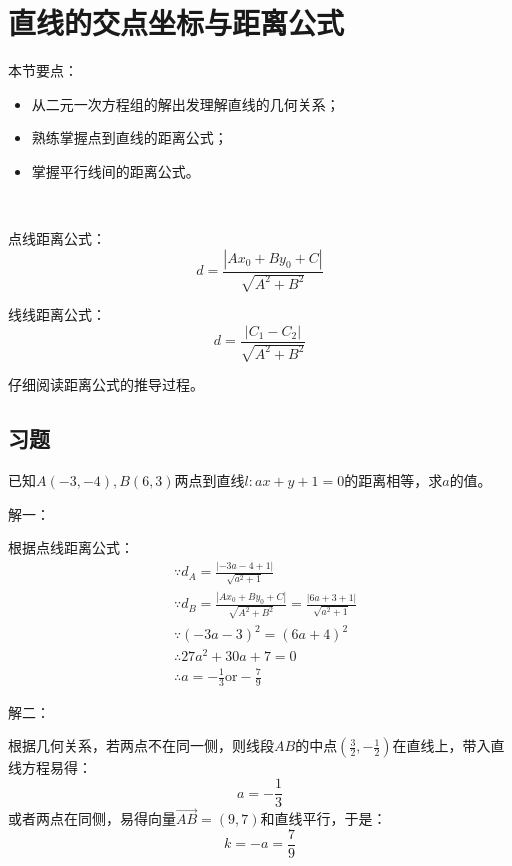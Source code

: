 \section{直线的交点坐标与距离公式}

本节要点：
\begin{itemize}
    \item 从二元一次方程组的解出发理解直线的几何关系；
    \item 熟练掌握点到直线的距离公式；
    \item 掌握平行线间的距离公式。
\end{itemize}

~

点线距离公式：
\[
d=\frac{\left| Ax_0+By_0+C \right|}{\sqrt{A^2+B^2}}
\]

线线距离公式：
\[
d=\frac{\left| C_1-C_2 \right|}{\sqrt{A^2+B^2}}
\]

\begin{tcolorbox}
仔细阅读距离公式的推导过程。
\end{tcolorbox}

\subsection{习题}

\begin{example}
已知$A\left( -3,-4 \right) ,B\left( 6,3 \right) $两点到直线$l:ax+y+1=0$的距离相等，求$a$的值。
\end{example}

解一：

根据点线距离公式：
\begin{align*}
&\because d_A=\frac{\left| -3a-4+1 \right|}{\sqrt{a^2+1}} \\
&\because d_B=\frac{\left| Ax_0+By_0+C \right|}{\sqrt{A^2+B^2}}=\frac{\left| 6a+3+1 \right|}{\sqrt{a^2+1}} \\
&\because \left( -3a-3 \right) ^2=\left( 6a+4 \right) ^2 \\
&\therefore 27a^2+30a+7=0 \\
&\therefore a=-\frac{1}{3}\mathrm{or}-\frac{7}{9}
\end{align*}

解二：

根据几何关系，若两点不在同一侧，则线段$AB$的中点$\left( \frac{3}{2},-\frac{1}{2} \right) $在直线上，带入直线方程易得：
\[
a=-\frac{1}{3}
\]
或者两点在同侧，易得向量$\overrightarrow{AB}=\left( 9,7 \right) $和直线平行，于是：
\[
k=-a=\frac{7}{9}
\]

